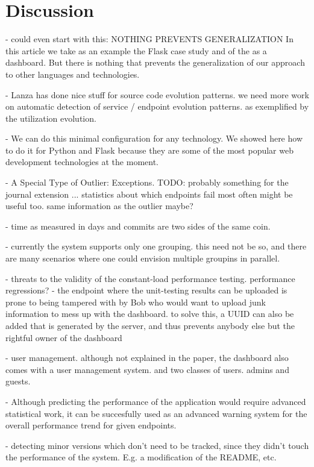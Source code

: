 
\section{Discussion}

- could even start with this: NOTHING PREVENTS GENERALIZATION
In this article we take as an example the Flask case study
and of the \tool as a dashboard. 
But there is nothing that prevents the generalization of 
our approach to other languages and technologies.


- Lanza has done nice stuff for source code evolution patterns. we need more work on automatic detection of service / endpoint evolution patterns. as exemplified by the utilization evolution.

- We can do this minimal configuration for any technology. We showed here how to do it for Python and Flask because they are some of the most popular web development technologies at the moment.


- A Special Type of Outlier: Exceptions. TODO: probably something for the journal extension ...
  statistics about which endpoints fail most often might be useful too.
  same information as the outlier maybe?

- time as measured in days and commits are two sides of the same coin. 

- currently the system supports only one grouping. this need not be so, and there are many scenarios where one could envision multiple groupins in parallel.

- threats to the validity of the constant-load performance testing. performance regressions? 
- the endpoint where the unit-testing results can be uploaded is prone to being tampered with by Bob who would want to upload junk information to mess up with the dashboard. to solve this, a UUID can also be added that is generated by the server, and thus prevents anybody else but the rightful owner of the dashboard 

- user management. although not explained in the paper, the dashboard also comes with a user management system. and two classes of users. admins and guests.

- Although predicting the performance of the application would require advanced statistical work, it can be succesfully used as an advanced warning system for the overall performance trend for given endpoints.

- detecting minor versions which don't need to be tracked, since they didn't touch the performance of the system. E.g. a modification of the README, etc. 

